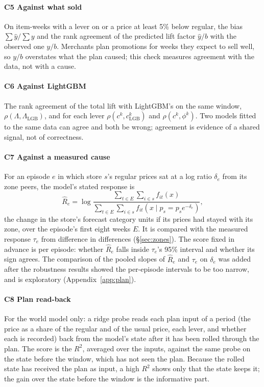 \paragraph{C5 Against what sold} On item-weeks with a lever on or a price at
least 5\% below regular, the bias $\sum \hat y / \sum y$ and the rank agreement
of the predicted lift factor $\hat y/b$ with the observed one $y/b$. Merchants
plan promotions for weeks they expect to sell well, so $y/b$ overstates what
the plan caused; this check measures agreement with the data, not with a cause.

\paragraph{C6 Against LightGBM} The rank agreement of the total lift with
LightGBM's on the same window, $\rho(\Lambda, \Lambda_{\mathrm{LGB}})$, and for
each lever $\rho(c^{k}, c^{k}_{\mathrm{LGB}})$ and $\rho(c^{k}, \phi^{k})$. Two
models fitted to the same data can agree and both be wrong; agreement is
evidence of a shared signal, not of correctness.

\paragraph{C7 Against a measured cause} For an episode $e$ in which store $s$'s
regular prices sat at a log ratio $\delta_e$ from its zone peers, the model's
stated response is
\begin{equation}
  \hat R_e = \log \frac{\sum_{t \in E} \sum_{i \in s} f_{it}(x)}
                      {\sum_{t \in E} \sum_{i \in s}
                       f_{it}(x \mid p_{s} = p_{s} e^{-\delta_e})},
\end{equation}
the change in the store's forecast category units if its prices had stayed with
its zone, over the episode's first eight weeks $E$. It is compared with the
measured response $\tau_e$ from difference in differences
(\S\ref{sec:zones}). The score fixed in advance is per episode: whether
$\hat R_e$ falls inside $\tau_e$'s 95\% interval and whether its sign agrees.
The comparison of the pooled slopes of $\hat R_e$ and $\tau_e$ on $\delta_e$
was added after the robustness results showed the per-episode intervals to be
too narrow, and is exploratory (Appendix~\ref{app:plan}).

\paragraph{C8 Plan read-back} For the world model only: a ridge probe reads
each plan input of a period (the price as a share of the regular and of the
usual price, each lever, and whether each is recorded) back from the model's
state after it has been rolled through the plan. The score is the $R^2$,
averaged over the inputs, against the same probe on the state before the
window, which has not seen the plan. Because the rolled state has received the
plan as input, a high $R^2$ shows only that the state keeps it; the gain over
the state before the window is the informative part.

